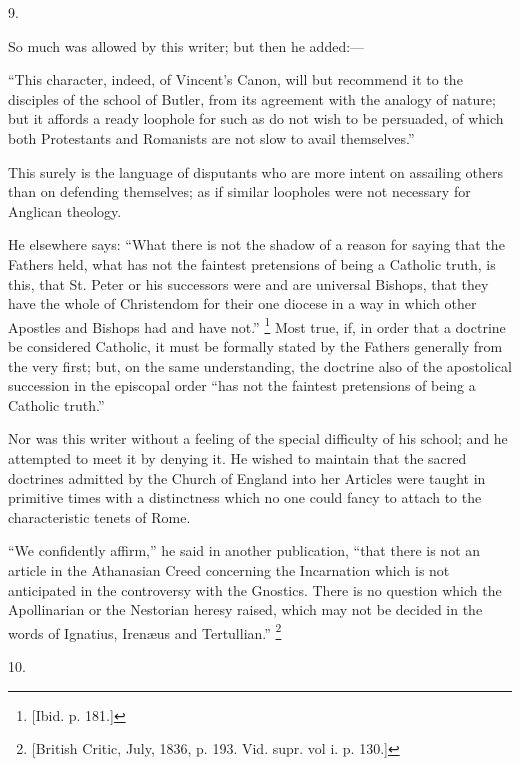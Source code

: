 9.

So much was allowed by this writer; but then he
added:—

``This character, indeed, of Vincent's Canon, will
but recommend it to the disciples of the school of
Butler, from its agreement with the analogy of nature;
but it affords a ready loophole for such as do not wish
to be persuaded, of which both Protestants and Romanists
are not slow to avail themselves.''

This surely is the language of disputants who are more
intent on assailing others than on defending themselves;
as if similar loopholes were not necessary for Anglican
theology.

He elsewhere says: ``What there is not the shadow
of a reason for saying that the Fathers held, what has
not the faintest pretensions of being a Catholic truth,
is this, that St. Peter or his successors were and are
universal Bishops, that they have the whole of
Christendom for their one diocese in a way in which other
Apostles and Bishops had and have not.'' \footnote{[Ibid. p. 181.]} Most
true, if, in order that a doctrine be considered
Catholic, it must be formally stated by the Fathers
generally from the very first; but, on the same
understanding, the doctrine also of the apostolical
succession in the episcopal order ``has not the
faintest pretensions of being a Catholic truth.''

Nor was this writer without a feeling of the special
difficulty of his school; and he attempted to meet it by
denying it. He wished to maintain that the sacred
doctrines admitted by the Church of England into her
Articles were taught in primitive times with a
distinctness which no one could fancy to attach to the
characteristic tenets of Rome.

``We confidently affirm,'' he said in another
publication, ``that there is not an article in the
Athanasian Creed concerning the Incarnation which is not
anticipated in the controversy with the Gnostics. There
is no question which the Apollinarian or the Nestorian
heresy raised, which may not be decided in the words of
Ignatius, Irenæus and Tertullian.'' \footnote{[British Critic, July, 1836, p.
193. Vid. supr. vol i. p. 130.]}

10.


